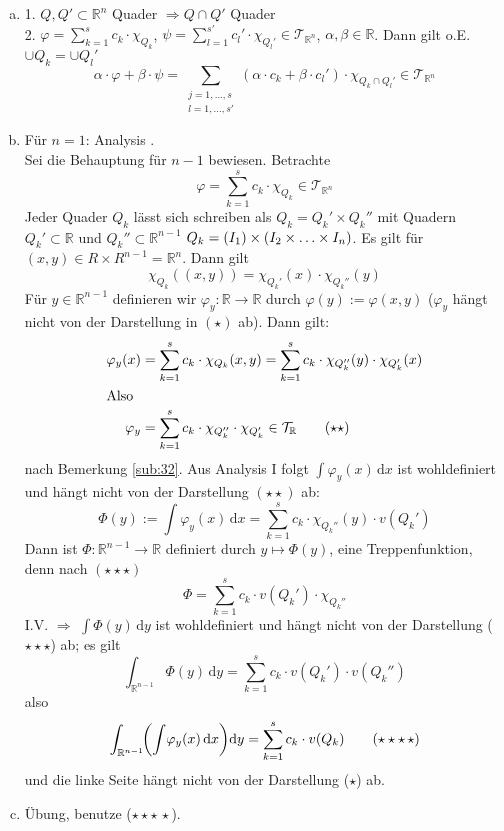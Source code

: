 \begin{enumerate}[a)]
	\item 1. $Q, Q' \subset \mathds{R}^n$ Quader $\Rightarrow Q \cap Q'$ Quader \\
	2. $\varphi = \sum_{k=1}^{s} c_k \cdot \chi_{Q_k}$, $\psi = \sum_{l=1}^{s'}c_l' \cdot \chi_{Q_l'} \in \mathcal{T}_{\mathds{R}^n} $, $\alpha, \beta \in \mathds{R}$. Dann
	gilt o.E. $\cup Q_k  = \cup Q_l'$
	\[
		\alpha \cdot \varphi + \beta \cdot \psi = \sum_{\substack{j=1, \ldots ,s \\ l=1, \ldots ,s'}} (\alpha \cdot c_k + \beta \cdot c_l') \cdot \chi_{Q_k \cap Q_l'} \in
		\mathcal{T}_{\mathds{R}^n} 
	\]
	\item Für $n=1$: Analysis . \\
	Sei die Behauptung für $n-1$ bewiesen. Betrachte 
	\[
		\varphi = \sum_{k=1}^{s} c_k \cdot \chi_{Q_k} \in \mathcal{T}_{\mathds{R}^n} \tag{$\star$}
	\]
	Jeder Quader $Q_k$ lässt sich schreiben als $Q_k = Q_k ' \times Q_k'' $ mit Quadern $Q_k'  \subset \mathds{R}$ und $Q_k'' \subset \mathds{R}^{n-1}$ 
	$Q_k = (I_1) \times \enbrace*{I_2 \times \ldots \times I_n} $. Es gilt für $(x,y) \in R \times R^{n-1}= \mathds{R}^n$. Dann gilt
	\[
		\chi_{Q_k} ((x,y)) = \chi_{Q_k'}(x) \cdot \chi_{Q_k''}(y)
	\]
	Für $y \in \mathds{R}^{n-1}$ definieren wir $\varphi_y : \mathds{R} \to \mathds{R}$ durch $\varphi(y) := \varphi(x,y)$ ($\varphi_y$ hängt nicht von der Darstellung
	in $(\star)$ ab). Dann gilt:
	\begin{align*}
		\varphi_y(x) &= \sum_{k=1}^{s} c_k \cdot \chi_{Q_k} (x,y) = \sum_{k=1}^{s} c_k \cdot \chi_{Q_k''}(y) \cdot \chi_{Q_k'}(x) \\
		\intertext{Also} \varphi_y &= \sum_{k=1}^{s} c_k \cdot \chi_{Q_k''} \cdot \chi_{Q_k'} \in \mathcal{T}_{\mathds{R}} \tag{$\star\star$}
	\end{align*}
	nach Bemerkung \ref{sub:32}. Aus Analysis I folgt $\int \varphi_y(x)  \, \mathrm{d}x $ ist wohldefiniert und hängt nicht von der Darstellung $(\star\star)$ ab:
	\[
		\Phi (y) := \int \! \varphi_y(x)  \, \mathrm{d}x  = \sum_{k=1}^{s} c_k \cdot  \chi_{Q_k''}(y) \cdot v(Q_k') \tag{$\star\star\star$}
	\]
	Dann ist $\Phi : \mathds{R}^{n-1} \to \mathds{R}$ definiert durch $y \mapsto \Phi(y)$, eine Treppenfunktion, denn nach $(\star\star\star)$
	\[
		\Phi = \sum_{k=1}^{s} c_k \cdot v(Q_k') \cdot \chi_{Q_k''}
	\]
	I.V. $\Rightarrow $ $\int \! \Phi(y)  \, \mathrm{d}y$ ist wohldefiniert und hängt nicht von der Darstellung ($\star\star\star$) ab; es gilt
	\[
		\int_{\mathds{R}^{n-1}} \! \Phi (y)  \, \mathrm{d}y = \sum_{k=1}^{s} c_k \cdot v(Q_k') \cdot v(Q_k'')
	\]
	also 
	\[
		\int_{\mathds{R}^{n-1}}\! \enbrace*{\int \! \varphi_y(x)  \, \mathrm{d}x } \mathrm{d}y  = \sum_{k=1}^{s} c_k \cdot v(Q_k) \tag{$\star\star\star\,\star$}
	\]
	und die linke Seite hängt nicht von der Darstellung ($\star$) ab. 
	\item Übung, benutze ($\star\star\star\,\star$). \bewende
\end{enumerate}

